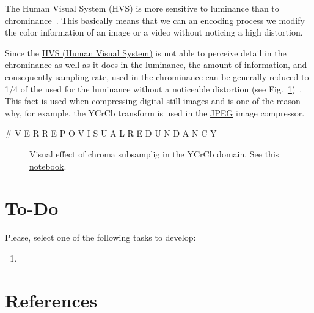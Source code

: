The Human Visual System (HVS) is more sensitive to luminance than to
chrominance~\cite{vruiz__visual_redundancy}. This basically means that
we can an encoding process we modify the color information of an image
or a video without noticing a high distortion.

Since the \href{https://en.wikipedia.org/wiki/Visual_system}{HVS
  (Human Visual System)} is not able to perceive detail in the
chrominance as well as it does in the luminance, the amount of
information, and consequently
\href{https://en.wikipedia.org/wiki/Sampling_(signal_processing)}{sampling
  rate}, used in the chrominance can be generally reduced to 1/4 of
the used for the luminance without a noticeable distortion (see
Fig.~\ref{fig:san-diego_chroma_subsampled})~\cite{burger2016digital}. This
\href{https://en.wikipedia.org/wiki/Bandwidth_(computing)}{fact is
  used when compressing} digital still images and is one of the reason
why, for example, the $\text{YCrCb}$ transform is used in the
\href{https://en.wikipedia.org/wiki/JPEG}{JPEG} image compressor.

#  V E R   R E P O   V I S U A L   R E D U N D A N C Y

\begin{figure}
  \centering
  \caption{Visual effect of chroma subsamplig in the YCrCb domain. See
    this
    \href{https://github.com/Sistemas-Multimedia/Sistemas-Multimedia.github.io/blob/master/milestones/06-YUV_compression/chroma_subsampling.ipynb}{notebook}.}
  \label{fig:san-diego_chroma_subsampled}
\end{figure}


\section{To-Do}
Please, select one of the following tasks to develop:
\begin{enumerate}
\item
\end{enumerate}

\section{References}

\renewcommand{\addcontentsline}[3]{}%

